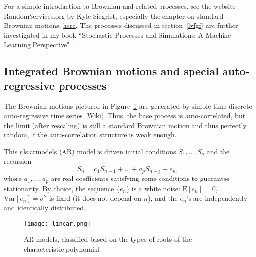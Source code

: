 \documentclass[oneside,10pt]{book}
\begin{document}
For a simple introduction to Brownian and related processes, see the website RandomServices.org by Kyle Siegrist, especially the chapter on
standard Brownian motions, \href{https://www.randomservices.org/random/brown/Standard.html}{here}. The processes discussed in
 section~\ref{lvfgf} are further investigated in my book ``Stochastic Processes and Simulations: A Machine Learning Perspective"~\cite{vgsimulnew}.



\subsection{Integrated Brownian motions and special auto-regressive processes}

The Brownian motions pictured in Figure~\ref{fig:linearbv2} are generated by simple time-discrete \textcolor{index}{auto-regressive time series}
 [\href{https://en.wikipedia.org/wiki/Autoregressive_model}{Wiki}]. Thus, the base process is auto-correlated, but the limit (after rescaling) is still
 a standard Brownian motion and thus perfectly random, if the auto-correlation structure is weak enough.

This \gls{gls:armodels} (AR) model is driven initial conditions $S_1,\dots,S_p$ and the recursion
$$
S_n=a_1 S_{n-1}+\dots + a_p S_{n-p}+e_n,
$$
where $a_1,\dots,a_p$ are real coefficients satisfying some conditions to guarantee \textcolor{index}{stationarity}. By choice, the sequence $\{e_n\}$ is  a \textcolor{index}{white noise}: $\text{E}[e_n]=0$, $\text{Var}[e_n]=\sigma^2$ is fixed (it does not depend on $n$), and the
 $e_n$'s are independently and identically distributed.

\begin{figure}[H]
\centering
\texttt{[image: linear.png]} %
\caption{AR models, classified based on the types of roots of the characteristic polynomial}
\label{fig:linearbv2}
\end{figure}
\end{document}
